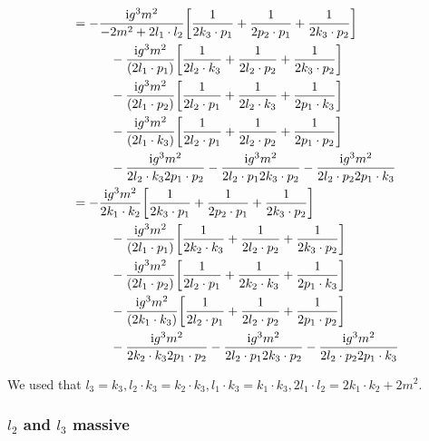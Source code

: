 \begin{align*}
    &=-\frac{\textnormal{i} g^3m^2}{-2m^2+2l_1\cdot l_2}\qty[\frac{1}{2k_3\cdot p_1}+\frac{1}{2p_2\cdot p_1}+\frac{1}{2k_3\cdot p_2}]\\
    &\quad\quad\quad-\frac{\textnormal{i} g^3m^2}{\qty(2l_1\cdot p_1)}\qty[\frac{1}{2l_2\cdot k_3}+\frac{1}{2l_2\cdot p_2}+\frac{1}{2k_3\cdot p_2}]\\
    &\quad\quad\quad-\frac{\textnormal{i} g^3m^2}{\qty(2l_1\cdot p_2)}\qty[\frac{1}{2l_2\cdot p_1}+\frac{1}{2l_2\cdot k_3}+\frac{1}{2p_1\cdot k_3}]\\
    &\quad\quad\quad-\frac{\textnormal{i} g^3m^2}{\qty(2l_1\cdot k_3)}\qty[\frac{1}{2l_2\cdot p_1}+\frac{1}{2l_2\cdot p_2}+\frac{1}{2p_1\cdot p_2}]\\
    &\quad\quad\quad-\frac{\textnormal{i} g^3m^2}{2l_2\cdot k_32p_1\cdot p_2}-\frac{\textnormal{i} g^3m^2}{2l_2\cdot p_12k_3\cdot p_2}-\frac{\textnormal{i} g^3m^2}{2l_2\cdot p_22p_1\cdot k_3}\\
    &=-\frac{\textnormal{i} g^3m^2}{2k_1\cdot k_2}\qty[\frac{1}{2k_3\cdot p_1}+\frac{1}{2p_2\cdot p_1}+\frac{1}{2k_3\cdot p_2}]\\
    &\quad\quad\quad-\frac{\textnormal{i} g^3m^2}{\qty(2l_1\cdot p_1)}\qty[\frac{1}{2k_2\cdot k_3}+\frac{1}{2l_2\cdot p_2}+\frac{1}{2k_3\cdot p_2}]\\
    &\quad\quad\quad-\frac{\textnormal{i} g^3m^2}{\qty(2l_1\cdot p_2)}\qty[\frac{1}{2l_2\cdot p_1}+\frac{1}{2k_2\cdot k_3}+\frac{1}{2p_1\cdot k_3}]\\
    &\quad\quad\quad-\frac{\textnormal{i} g^3m^2}{\qty(2k_1\cdot k_3)}\qty[\frac{1}{2l_2\cdot p_1}+\frac{1}{2l_2\cdot p_2}+\frac{1}{2p_1\cdot p_2}]\\
    &\quad\quad\quad-\frac{\textnormal{i} g^3m^2}{2k_2\cdot k_32p_1\cdot p_2}-\frac{\textnormal{i} g^3m^2}{2l_2\cdot p_12k_3\cdot p_2}-\frac{\textnormal{i} g^3m^2}{2l_2\cdot p_22p_1\cdot k_3}
\end{align*}

We used that $l_3=k_3, l_2\cdot k_3 = k_2\cdot k_3, l_1\cdot k_3=k_1\cdot k_3, 2l_1\cdot l_2=2k_1\cdot k_2+2m^2$.

\subsubsection{$l_2$ and $l_3$ massive}

